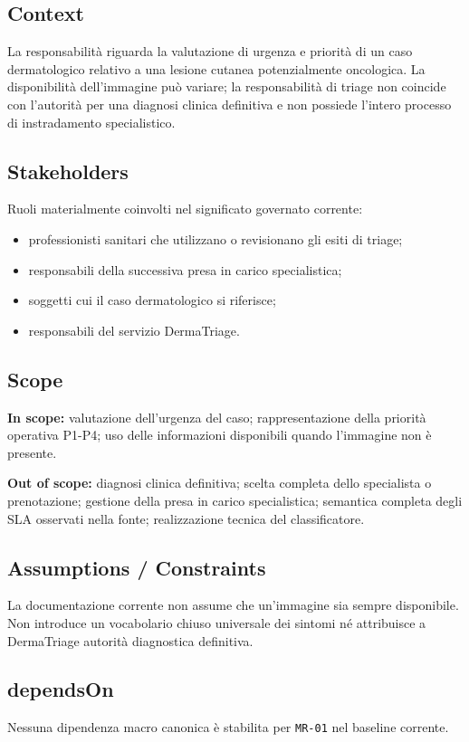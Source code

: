 \documentclass[11pt,a4paper]{article}
\begin{document}
\subsection{Context}
La responsabilità riguarda la valutazione di urgenza e priorità di un caso dermatologico relativo a una lesione cutanea potenzialmente oncologica. La disponibilità dell'immagine può variare; la responsabilità di triage non coincide con l'autorità per una diagnosi clinica definitiva e non possiede l'intero processo di instradamento specialistico.

\subsection{Stakeholders}
Ruoli materialmente coinvolti nel significato governato corrente:
\begin{itemize}
\item professionisti sanitari che utilizzano o revisionano gli esiti di triage;
\item responsabili della successiva presa in carico specialistica;
\item soggetti cui il caso dermatologico si riferisce;
\item responsabili del servizio DermaTriage.
\end{itemize}

\subsection{Scope}
\textbf{In scope:} valutazione dell'urgenza del caso; rappresentazione della priorità operativa P1-P4; uso delle informazioni disponibili quando l'immagine non è presente.

\textbf{Out of scope:} diagnosi clinica definitiva; scelta completa dello specialista o prenotazione; gestione della presa in carico specialistica; semantica completa degli SLA osservati nella fonte; realizzazione tecnica del classificatore.

\subsection{Assumptions / Constraints}
La documentazione corrente non assume che un'immagine sia sempre disponibile. Non introduce un vocabolario chiuso universale dei sintomi né attribuisce a DermaTriage autorità diagnostica definitiva.

\subsection{dependsOn}
Nessuna dipendenza macro canonica è stabilita per \texttt{MR-01} nel baseline corrente.
\end{document}
